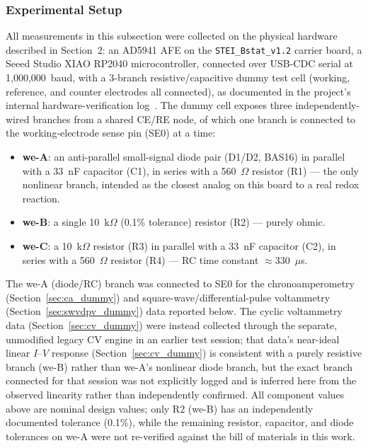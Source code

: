 \documentclass[preprint,12pt]{elsarticle}
\begin{document}
\subsubsection{Experimental Setup}
\label{sec:setup_dummy}
All measurements in this subsection were collected on the physical hardware described in Section~2: an AD5941 AFE on the \texttt{STEI\_Bstat\_v1.2} carrier board, a Seeed Studio XIAO RP2040 microcontroller, connected over USB-CDC serial at 1{,}000{,}000~baud, with a 3-branch resistive/capacitive dummy test cell (working, reference, and counter electrodes all connected), as documented in the project's internal hardware-verification log~\cite{ref:dummycell_log}. The dummy cell exposes three independently-wired branches from a shared CE/RE node, of which one branch is connected to the working-electrode sense pin (SE0) at a time:
\begin{itemize}
\item \textbf{we-A}: an anti-parallel small-signal diode pair (D1/D2, BAS16) in parallel with a 33~nF capacitor (C1), in series with a 560~$\Omega$ resistor (R1) --- the only nonlinear branch, intended as the closest analog on this board to a real redox reaction.
\item \textbf{we-B}: a single 10~k$\Omega$ (0.1\% tolerance) resistor (R2) --- purely ohmic.
\item \textbf{we-C}: a 10~k$\Omega$ resistor (R3) in parallel with a 33~nF capacitor (C2), in series with a 560~$\Omega$ resistor (R4) --- RC time constant $\approx$330~$\mu$s.
\end{itemize}
The we-A (diode/RC) branch was connected to SE0 for the chronoamperometry (Section~\ref{sec:ca_dummy}) and square-wave/differential-pulse voltammetry (Section~\ref{sec:swvdpv_dummy}) data reported below. The cyclic voltammetry data (Section~\ref{sec:cv_dummy}) were instead collected through the separate, unmodified legacy CV engine in an earlier test session; that data's near-ideal linear $I$--$V$ response (Section~\ref{sec:cv_dummy}) is consistent with a purely resistive branch (we-B) rather than we-A's nonlinear diode branch, but the exact branch connected for that session was not explicitly logged and is inferred here from the observed linearity rather than independently confirmed. All component values above are nominal design values; only R2 (we-B) has an independently documented tolerance (0.1\%), while the remaining resistor, capacitor, and diode tolerances on we-A were not re-verified against the bill of materials in this work.
\end{document}
